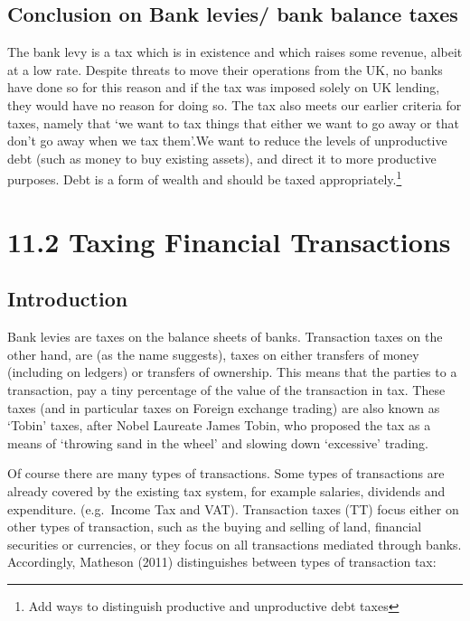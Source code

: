 \documentclass[]{tufte-handout}
\begin{document}
\hypertarget{conclusion-on-bank-levies-bank-balance-taxes}{%
\subsection{Conclusion on Bank levies/ bank balance
taxes}\label{conclusion-on-bank-levies-bank-balance-taxes}}

The bank levy is a tax which is in existence and which raises some
revenue, albeit at a low rate. Despite threats to move their operations
from the UK, no banks have done so for this reason and if the tax was
imposed solely on UK lending, they would have no reason for doing so.
The tax also meets our earlier criteria for taxes, namely that `we want
to tax things that either we want to go away or that don't go away when
we tax them'.We want to reduce the levels of unproductive debt (such as
money to buy existing assets), and direct it to more productive
purposes. Debt is a form of wealth and should be taxed
appropriately.\footnote{Add ways to distinguish productive and
  unproductive debt taxes}

\hypertarget{taxing-financial-transactions}{%
\section{11.2 Taxing Financial
Transactions}\label{taxing-financial-transactions}}

\hypertarget{introduction-2}{%
\subsection{Introduction}\label{introduction-2}}

Bank levies are taxes on the balance sheets of banks. Transaction taxes
on the other hand, are (as the name suggests), taxes on either transfers
of money (including on ledgers) or transfers of ownership. This means
that the parties to a transaction, pay a tiny percentage of the value of
the transaction in tax. These taxes (and in particular taxes on Foreign
exchange trading) are also known as `Tobin' taxes, after Nobel Laureate
James Tobin, who proposed the tax as a means of `throwing sand in the
wheel' and slowing down `excessive' trading.

Of course there are many types of transactions. Some types of
transactions are already covered by the existing tax system, for example
salaries, dividends and expenditure. (e.g.~Income Tax and VAT).
Transaction taxes (TT) focus either on other types of transaction, such
as the buying and selling of land, financial securities or currencies,
or they focus on all transactions mediated through banks. Accordingly,
Matheson (2011) distinguishes between types of transaction tax:
\end{document}
